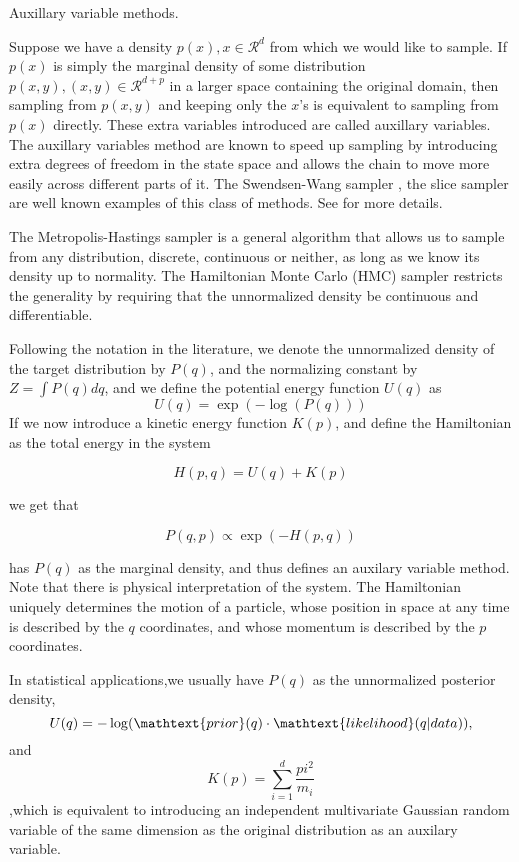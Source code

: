 \documentclass{book}
\begin{document}
\begin{enumerate}
Auxillary variable methods. 

Suppose we have a density $p(x),x \in \mathcal{R}^d$ from which we would like to sample. If $p(x)$ is simply the marginal density of some distribution $p(x,y), (x,y) \in \mathcal{R}^{d+p}$ in a larger space containing the original domain, then sampling from $p(x,y)$ and keeping only the $x$'s is equivalent to sampling from $p(x)$ directly. These extra variables introduced are called auxillary variables. The auxillary variables method are known to speed up sampling by introducing extra degrees of freedom in the state space and allows the chain to move more easily across different parts of it. The Swendsen-Wang sampler \cite{wang1990cluster}, the slice sampler\cite{wang1990cluster} are well known examples of this class of methods. See \cite{liang2011advanced,liu2008monte} for more details.

The Metropolis-Hastings sampler is a general algorithm that allows us to sample from any distribution, discrete, continuous or neither, as long as we know its density up to normality. The Hamiltonian Monte Carlo (HMC) sampler restricts the generality by requiring that the unnormalized density be continuous and differentiable. 

Following the notation in the literature, we denote the unnormalized density of the target distribution by $P(q)$, and the normalizing constant by $Z = \int P(q)dq $, and we define the potential energy function $U(q)$ as 
\[ U(q) =  \exp(-\log(P(q))) \]
If we now introduce a kinetic energy function $K(p)$, and define
the Hamiltonian as the total energy in the system 

\[ H(p,q) = U(q) + K(p) \]

we get that 

\[P(q,p) \propto  \exp(-H(p,q)) \]

has $P(q)$ as the marginal density, and thus defines an auxilary variable method. Note that there is physical interpretation of the system. The Hamiltonian uniquely determines the motion of a particle, whose position in space at any time is described by the $q$ coordinates, and whose momentum is described by the $p$ coordinates.

In statistical applications,we usually have $P(q)$ as the unnormalized posterior
density, 
\[U(q) = -\log(\mathtext{prior}(q) \cdot \mathtext{likelihood}(q|data) ), \]
and 
\[K(p) = \sum_{i=1}^d \frac{pi^2}{m_i} \]
,which is equivalent to introducing an independent multivariate Gaussian random variable of
the same dimension as the original distribution as an auxilary variable. 


\end{enumerate}
\end{document}
